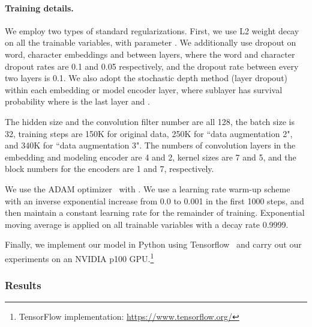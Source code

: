 \documentclass{article} \usepackage{iclr2018_conference,times}
\begin{document}
\paragraph{Training details.}
We employ two types of standard regularizations. First, we use L2 weight decay on all the trainable variables, with parameter . We additionally use dropout on word, character embeddings and between layers, where the word and character dropout rates are 0.1 and 0.05 respectively, and the dropout rate between every two layers is 0.1. We also adopt the stochastic depth method (layer dropout)~\citep{HuangSLSW16} within each embedding or model encoder layer, where sublayer  has survival probability
 where  is the last layer and . 

The hidden size and the convolution filter number are all 128, the batch size is 32, training steps are 150K for original data, 250K for ``data augmentation  2", and 340K for ``data augmentation  3". The numbers of convolution layers in the embedding and modeling encoder are 4 and 2, kernel sizes are 7 and 5, and the block numbers for the encoders are 1 and 7, respectively.


We use the ADAM optimizer~\citep{KingmaB14} with . We use a learning rate warm-up scheme with an inverse exponential increase from 0.0 to 0.001 in the first 1000 steps, and then maintain a constant learning rate for the remainder of training.
Exponential moving average is applied on all trainable variables with a decay rate 0.9999.

Finally, we implement our model in Python using Tensorflow~\citep{AbadiABBCCCDDDG16} and carry out our experiments on an NVIDIA p100 GPU.\footnote{TensorFlow implementation: \url{https://www.tensorflow.org/}}


\subsubsection{Results}
\end{document}
